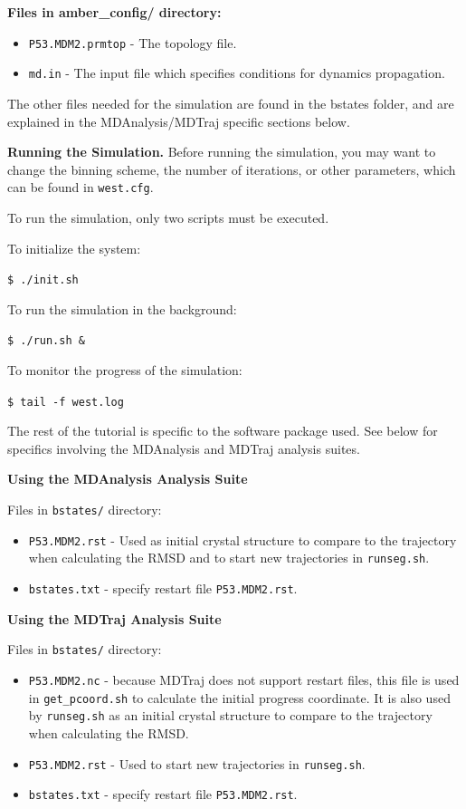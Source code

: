 \documentclass[9pt,tutorial,pubversion]{livecoms}
\begin{document}
\textbf{Files in amber\_config/ directory:}
\begin{itemize} 
\item \verb|P53.MDM2.prmtop| - The topology file.
\item \verb|md.in| - The input file which specifies conditions for dynamics propagation.
\end{itemize}

The other files needed for the simulation are found in the bstates folder, and are explained in the MDAnalysis/MDTraj specific sections below.

\textbf{Running the Simulation.} Before running the simulation, you may want to change the binning scheme, the number of iterations, or other parameters, which can be found in \verb|west.cfg|.

To run the simulation, only two scripts must be executed. 

To initialize the system:

\verb|$ ./init.sh|

To run the simulation in the background:

\verb|$ ./run.sh &|

To monitor the progress of the simulation:

\verb|$ tail -f west.log|

The rest of the tutorial is specific to the software package used. 
See below for specifics involving the MDAnalysis and MDTraj analysis suites.

\textbf{Using the MDAnalysis Analysis Suite}

Files in \verb|bstates/| directory:
\begin{itemize}
\item \verb|P53.MDM2.rst| - Used as initial crystal structure to compare to the trajectory when calculating the RMSD and to start new trajectories in \verb|runseg.sh|.
\item \verb|bstates.txt| - specify restart file \verb|P53.MDM2.rst|.
\end{itemize}

\textbf{Using the MDTraj Analysis Suite}

Files in \verb|bstates/| directory:
\begin{itemize}
\item \verb|P53.MDM2.nc| - because MDTraj does not support restart files, this file is used in \verb|get_pcoord.sh| to calculate the initial progress coordinate. 
It is also used by \verb|runseg.sh| as an initial crystal structure to compare to the trajectory when calculating the RMSD.
\item \verb|P53.MDM2.rst| - Used to start new trajectories in \verb|runseg.sh|.
\item \verb|bstates.txt| - specify restart file \verb|P53.MDM2.rst|.
\end{itemize}
\end{document}
